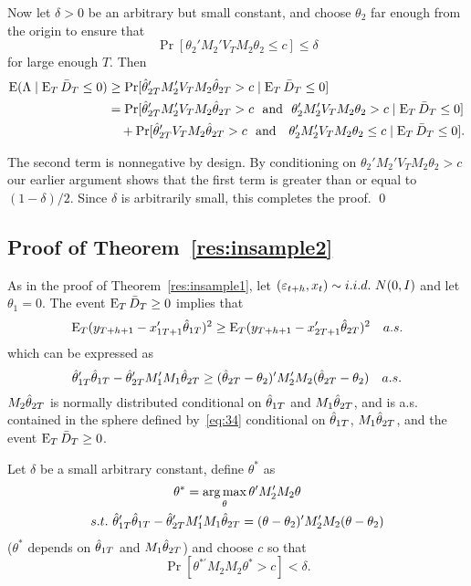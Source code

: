 \documentclass[12pt]{article}
\begin{document}
Now let $\delta > 0$ be an arbitrary but small constant, and choose
$\theta_2$ far enough from the origin to ensure that
\begin{equation*}
  \Pr[\theta_2'M_2' V_T M_2 \theta_2 \leq c] \leq \delta
\end{equation*}
for large enough $T$. Then
\begin{align*}
  \operatorname{E}(\Lambda \mid \operatorname{E}_T \bar{D}_{T} \leq 0) &
  \geq \Pr[\hat\theta_{2T}' M_2' V_T M_2 \hat\theta_{2T} > c \mid \operatorname{E}_T \bar{D}_{T} \leq 0] \\
  &= \Pr[\hat\theta_{2T}' M_2' V_T M_2 \hat\theta_{2T} > c \text{~~and~~}
  \theta_2'M_2' V_T M_2 \theta_2 > c \mid \operatorname{E}_T \bar{D}_{T}  \leq 0] \\
  & \quad + \Pr[\hat\theta_{2T}' V_T M_2 \hat\theta_{2T} > c \text{~~and~~ }
  \theta_2'M_2' V_T M_2 \theta_2 \leq c \mid \operatorname{E}_T \bar{D}_{T} \leq 0].
\end{align*}

The second term is nonnegative by design. By conditioning on
$\theta_2'M_2' V_T M_2 \theta_2 > c$ our earlier argument shows that
the first term is greater than or equal to $(1 - \delta) / 2$. Since
$\delta$ is arbitrarily small, this completes the proof.
\qed

\subsection*{Proof of Theorem~\ref{res:insample2}}
As in the proof of Theorem~\ref{res:insample1}, let $(\varepsilon_{t+h}, x_{t})
\sim i.i.d.\ N(0,I)$ and let $\theta_1 = 0$. The event $\operatorname{E}_T \bar{D}_{T}
\geq 0$ implies that
\begin{equation*}
  \operatorname{E}_T (y_{T+h+1} - x_{1T+1}'\hat\theta_{1T})^2
  \geq \operatorname{E}_T (y_{T+h+1} - x_{2T+1}'\hat\theta_{2T})^2 \quad a.s.
\end{equation*}
which can be expressed as
\begin{equation}\label{eq:34}
  \hat\theta_{1T}'\hat\theta_{1T} - \hat\theta_{2T}'M_1'M_1\hat\theta_{2T}
  \geq (\hat\theta_{2T} - \theta_2)' M_2'M_2 (\hat\theta_{2T} - \theta_2) \quad a.s.
\end{equation}
$M_2 \hat\theta_{2T}$ is normally distributed conditional on $\hat\theta_{1T}$ and
$M_1 \hat\theta_{2T}$, and is a.s. contained in the sphere defined
by~\eqref{eq:34} conditional on $\hat\theta_{1T}$, $M_1 \hat\theta_{2T}$, and the
event $\operatorname{E}_T \bar{D}_{T} \geq 0$.

Let $\delta$ be a small arbitrary constant, define $\theta^*$ as
\begin{gather*}
  \theta^* = \operatorname*{arg\,max}_\theta \theta' M_2' M_2 \theta \\
  s.t.\ \hat\theta_{1T}'\hat\theta_{1T} - \hat\theta_{2T}'M_1'M_1\hat\theta_{2T} = (\theta - \theta_2)' M_2'M_2 (\theta - \theta_2)
\end{gather*}
($\theta^*$ depends on $\hat\theta_{1T}$ and $M_1 \hat\theta_{2T}$) and choose $c$ so
that
\begin{equation*}
  \Pr[ \theta^{* \prime} M_2 M_2 \theta^* > c] < \delta.
\end{equation*}
\end{document}
